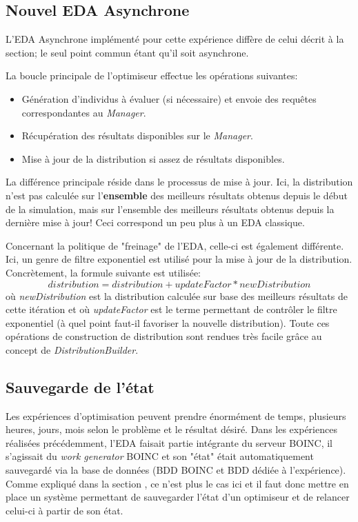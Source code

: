 \documentclass[a4paper, 11pt]{article}
\begin{document}


\subsection{Nouvel EDA Asynchrone}
L'EDA Asynchrone implémenté pour cette expérience diffère de celui décrit à la section; le seul point commun étant qu'il soit asynchrone. %

La boucle principale de l'optimiseur effectue les opérations suivantes:
\begin{itemize}
\item Génération d'individus à évaluer (si nécessaire) et envoie des requêtes correspondantes au \textit{Manager}.
\item Récupération des résultats disponibles sur le \textit{Manager}.
\item Mise à jour de la distribution si assez de résultats disponibles.
\end{itemize}

La différence principale réside dans le processus de mise à jour. Ici, la distribution n'est pas calculée sur l'\textbf{ensemble} des meilleurs résultats obtenus depuis le début de la simulation, mais sur l'ensemble des meilleurs résultats obtenus depuis la dernière mise à jour! Ceci correspond un peu plus à un EDA classique.

Concernant la politique de "freinage" de l'EDA, celle-ci est également différente. Ici, un genre de filtre exponentiel %
est utilisé pour la mise à jour de la distribution. Concrètement, la formule suivante est utilisée:
$$distribution = distribution + updateFactor * newDistribution$$
où \textit{newDistribution} est la distribution calculée sur base des meilleurs résultats de cette itération et où \textit{updateFactor} est le terme permettant de contrôler le filtre exponentiel (à quel point faut-il favoriser la nouvelle distribution). Toute ces opérations de construction de distribution sont rendues très facile grâce au concept de \textit{DistributionBuilder}.

\subsection{Sauvegarde de l'état}
Les expériences d'optimisation peuvent prendre énormément de temps, plusieurs heures, jours, mois selon le problème et le résultat désiré. Dans les expériences réalisées précédemment, l'EDA faisait partie intégrante du serveur \textsc{BOINC}, il s'agissait du \textit{work generator} \textsc{BOINC} et son "état" était automatiquement sauvegardé via la base de données (BDD \textsc{BOINC} et BDD dédiée à l'expérience). Comme expliqué dans la section %
, ce n'est plus le cas ici et il faut donc mettre en place un système permettant de sauvegarder l'état d'un optimiseur et de relancer celui-ci à partir de son état.
\end{document}
